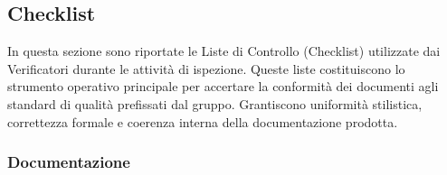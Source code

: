 \documentclass[a4paper,12pt]{article}
\begin{document}
        \subsection{Checklist}

        In questa sezione sono riportate le Liste di Controllo (Checklist) utilizzate dai Verificatori durante le attività di ispezione. Queste liste costituiscono lo strumento operativo principale per accertare la conformità dei documenti agli standard di qualità prefissati dal gruppo. 
        Grantiscono uniformità stilistica, correttezza formale e coerenza interna della documentazione prodotta.

            \subsubsection{Documentazione}
\end{document}
